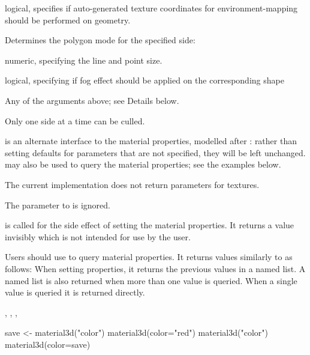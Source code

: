 \documentclass{article}
\begin{document}
\begin{Arguments}
\begin{ldescription}
\item[\code{texenvmap}] logical, specifies if auto-generated texture coordinates for environment-mapping 
should be performed on geometry.

\item[\code{front, back}] Determines the polygon mode for the specified side:

\item[\code{size}] numeric, specifying the line and point size.

\item[\code{fog}] logical, specifying if fog effect should be applied on the corresponding shape
\item[\code{...}] Any of the arguments above; see Details below.
\end{ldescription}
\end{Arguments}
\begin{Details}\relax
Only one side at a time can be culled.

 is an alternate interface to the material properties, modelled after
:  rather than setting defaults for parameters that are not specified, 
they will be left unchanged.   may also be used to query the material
properties; see the examples below.

The current implementation does not return parameters for textures.

The  parameter to  is ignored.
\end{Details}
\begin{Value}
 is called for the side effect of setting the material properties.
It returns a value invisibly which is not intended for use by the user.

Users should use  to query material properties.  It returns values similarly
to  as follows:
When setting properties, it returns the previous values in a named list.  A named list is also
returned when more than one value is queried.  When a single value is queried it is returned 
directly.
\end{Value}
\begin{SeeAlso}\relax
{},
,
,
\end{SeeAlso}
\begin{Examples}
\begin{ExampleCode}
save <- material3d("color")
material3d(color="red")
material3d("color")
material3d(color=save)
\end{ExampleCode}
\end{Examples}
\end{document}
